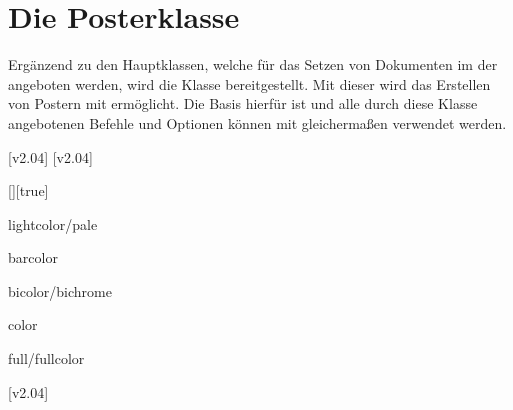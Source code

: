 \chapter[Die Klasse tudscrposter]{Die Posterklasse}
\label{sec:poster}
\begin{Declaration*}{}
Ergänzend zu den Hauptklassen, welche für das Setzen von Dokumenten im \CD der 
\TnUD angeboten werden, wird die Klasse  bereitgestellt. 
Mit dieser wird das Erstellen von Postern mit  ermöglicht. Die 
Basis hierfür ist  und alle durch diese Klasse angebotenen 
Befehle und Optionen können mit  gleichermaßen verwendet 
werden.
\end{Declaration*}

[v2.04]
[v2.04]

\begin{Declaration}[v2.04]{[\PSet]}[true]
\printdeclarationlist%
\begin{values}
\itemfalse
{}
\item[lightcolor/pale]
\item[barcolor]
\item[bicolor/bichrome]
\item[color]
\item[full/fullcolor]
\end{values}
\end{Declaration}



\begin{Declaration}[v2.04]{}
\printdeclarationlist%
\end{Declaration}

\begin{Declaration}[v2.04]{}
\begin{Declaration}[v2.04]{}
\begin{Declaration}{}
\printdeclarationlist%
[v2.04]
%
\end{Declaration}
\end{Declaration}
\end{Declaration}